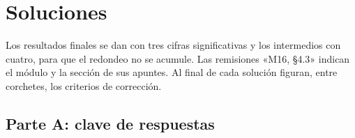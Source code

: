 \chapter{Soluciones}
\label{ap:soluciones}

Los resultados finales se dan con tres cifras significativas y los intermedios con cuatro, para que el redondeo no se acumule. Las remisiones «M16, §4.3» indican el módulo y la sección de sus apuntes. Al final de cada solución figuran, entre corchetes, los criterios de corrección.

\section{Parte A: clave de respuestas}

